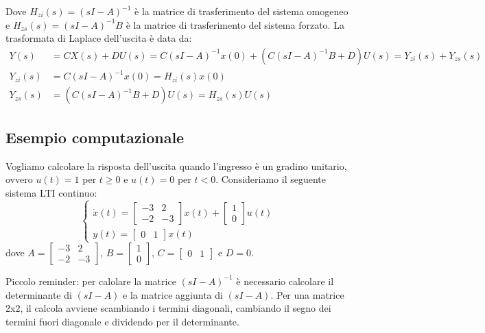 Dove $H_{zi}(s) = (sI - A)^{-1}$ è la matrice di trasferimento del sistema
omogeneo e $H_{zs}(s) = (sI - A)^{-1} B$ è la matrice di trasferimento del
sistema forzato. La trasformata di Laplace dell'uscita è data da:
\begin{align*}
    Y(s)      & = C X(s) + D U(s) = C (sI - A)^{-1} x(0) + (C (sI - A)^{-1} B + D) U(s) = Y_{zi}(s) + Y_{zs}(s) \\
    Y_{zi}(s) & = C (sI - A)^{-1} x(0) = H_{zi}(s) x(0)                                                         \\
    Y_{zs}(s) & = (C (sI - A)^{-1} B + D) U(s) = H_{zs}(s) U(s)
\end{align*}
\subsection{Esempio computazionale}
Vogliamo calcolare la risposta dell'uscita quando l'ingresso è un gradino
unitario, ovvero $u(t) = 1$ per $t \geq 0$ e $u(t) = 0$ per $t < 0$.
Consideriamo il seguente sistema LTI continuo:
\begin{equation}
    \begin{cases}
        \dot{x}(t) = \begin{bmatrix} -3 & 2 \\ -2 & -3 \end{bmatrix} x(t) + \begin{bmatrix} 1 \\ 0 \end{bmatrix} u(t) \\
        y(t) = \begin{bmatrix} 0 & 1 \end{bmatrix} x(t)
    \end{cases}
\end{equation}
dove $A = \begin{bmatrix} -3 & 2 \\ -2 & -3 \end{bmatrix}$, $B = \begin{bmatrix}
        1 \\ 0 \end{bmatrix}$, $C = \begin{bmatrix} 0 & 1 \end{bmatrix}$ e $D = 0$.
\begin{tcolorbox}
    Piccolo reminder: per calolare la matrice $(sI - A)^{-1}$ è necessario
    calcolare il determinante di $(sI - A)$ e la matrice aggiunta di $(sI - A)$.
    Per una matrice 2x2, il calcola avviene scambiando i termini diagonali,
    cambiando il segno dei termini fuori diagonale e dividendo per il
    determinante.
\end{tcolorbox}
